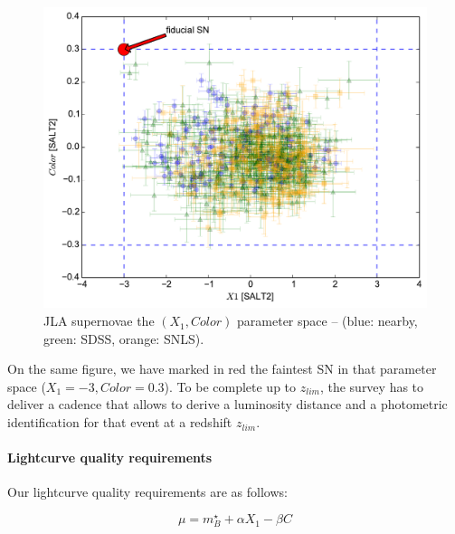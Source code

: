 \documentclass[\docopts]{\docclass}
\begin{document}
\begin{figure}[t]
\begin{center}
\includegraphics[width=0.75\linewidth]{sn_parameter_space.pdf}
\caption{JLA supernovae the $(X_1,Color)$ parameter space -- (blue:
  nearby, green: SDSS, orange: SNLS).  }
\label{fig:jla_X1_C}
\end{center}
\end{figure}

On the same figure, we have marked in red the faintest SN in that
parameter space ($X_1=-3, Color=0.3$). To be complete up to $z_{lim}$,
the survey has to deliver a cadence that allows to derive a luminosity
distance and a photometric identification for that event at a redshift
$z_{lim}$.

\paragraph{Lightcurve quality requirements} Our lightcurve quality
requirements are as follows:

\begin{equation}
  \mu = m^\star_B + \alpha X_1 - \beta C
\end{equation}
\end{document}
